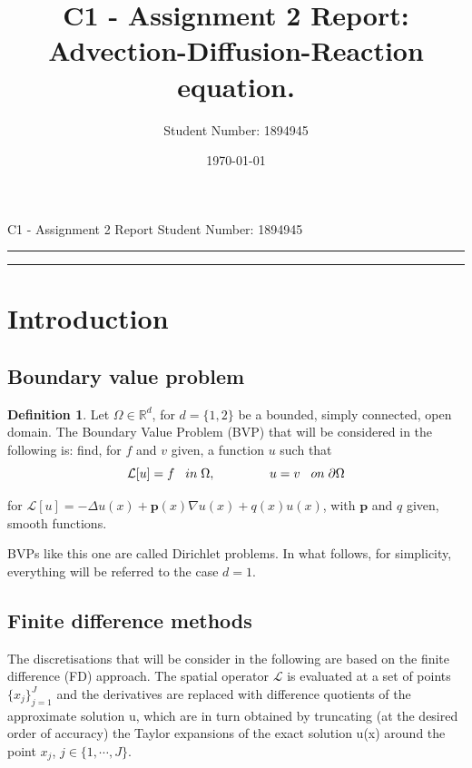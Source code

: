 \documentclass[11pt]{article}
\title{C1 - Assignment 2 Report: Advection-Diffusion-Reaction equation.} %
\author{Student Number: 1894945} %
\date{\today} %
\theoremstyle{theorem}
\theoremstyle{definition}
\newtheorem{definition}{Definition}
\begin{document}
\maketitle %

\begin{center}
C1 - Assignment 2 Report \hfill
Student Number: 1894945
\vspace{3pt} \hrule \vspace{3pt} \hrule
\end{center}

\tableofcontents

\clearpage



\section{Introduction}

\subsection{Boundary value problem}

\begin{definition}
	\label{defn:BVP}
	Let $\Omega\in\mathbb{R}^{d}$, for $d=\lbrace 1, 2\rbrace$ be a bounded, simply connected, open domain. The Boundary Value Problem (BVP) that will be considered in the following is: find, for $f$ and $v$ given, a function $u$ such that 
	\begin{equation}
		\label{eqn:BVP}
		\mathcal{L}[u]=f\hspace{3mm}in\hspace{1mm}\Omega,\hspace{15mm}u=v\hspace{3mm}on\hspace{1mm}\partial\Omega
	\end{equation}
	
	for $\mathcal{L}[u]=-\Delta u(x) + \mathbf{p}(x)\nabla u(x) + q(x)u(x)$, with $\mathbf{p}$ and $q$ given, smooth functions. 
\end{definition}

BVPs like this one are called Dirichlet problems. In what follows, for simplicity, everything will be referred to the case $d=1$. 

\subsection{Finite difference methods}
The discretisations that will be consider in the following are based on the finite difference (FD) approach. The spatial operator $\mathcal{L}$ is evaluated at a set of points $\lbrace x_j\rbrace_{j=1}^{J}$ and the derivatives are replaced with difference quotients of the approximate solution u, which are in turn obtained by truncating (at the desired order of accuracy) the Taylor expansions of the exact solution u(x) around the point $x_j$, $j\in\lbrace1,\cdots, J\rbrace$.\\
\end{document}
